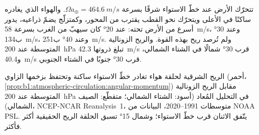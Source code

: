تتحرّك الأرض عند خطّ الاستواء شرقًا بسرعة $\Omega a_\oplus = \qty{464.6}{m/s}$. والهواء الذي يغادره ساكنًا في الأعلى ويتحرّك نحو القطب يقترب من المحور، وكمتزلّج يضمّ ذراعيه، يدور أسرع من الأرض تحته: عند \ang{20} كان سيهبّ من الغرب بسرعة \qty{58}{m/s}، وعند \ang{30} ب\qty{134}{m/s}، وعند \ang{40} ب\qty{251}{m/s}. ولم تُرصد ريح بهذه القوة. والريح الزونالية المتوسطة عند \qty{200}{hPa} تبلغ ذروتها \qty{42.3}{m/s} قرب \ang{30} شمالًا في الشتاء الشمالي، و\qty{40.4}{m/s} قرب \ang{30} جنوبًا في الشتاء الجنوبي.

\begin{omfigure}

{\small الريح الشرقية لحلقة هواء تغادر خطّ الاستواء ساكنة وتحتفظ بزخمها الزاوي (أحمر، \cref{prop:b1:atmospheric-circulation:angular-momentum}) مقابل الريح الزونالية المتوسطة عند \qty{200}{hPa} في التحليل المُعاد (أسود: الشتاء الشمالي؛ متقطّع: الصيف الشمالي)، NCEP-NCAR Reanalysis~1، متوسطات 1991--2020، البيانات من NOAA PSL. يتّفق الاثنان قرب خطّ الاستواء؛ وشمال \ang{15} تسبق الحلقة الريح الحقيقية أكثر فأكثر.}
\label{fig:b1:atmospheric-circulation:angular-momentum}
\end{omfigure}

